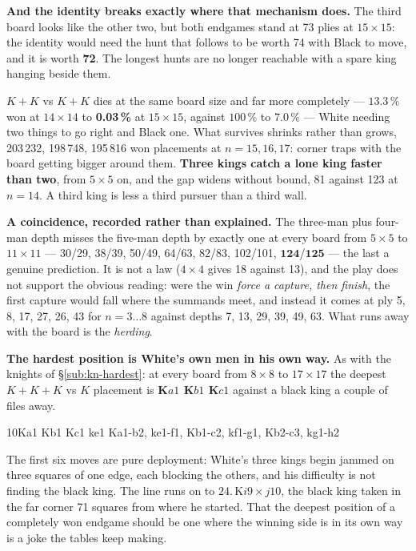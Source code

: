\documentclass[10pt]{article}
\begin{document}
\medskip
\noindent
\textbf{And the identity breaks exactly where that mechanism does.} The third
board looks like the other two, but both endgames stand at 73 plies at
$15\times15$: the identity would need the hunt that follows to be worth 74 with
Black to move, and it is worth \textbf{72}. The longest hunts are no longer
reachable with a spare king hanging beside them.

\smallskip
\noindent
$K\!+\!K$ vs $K\!+\!K$ dies at the same board size and far more completely ---
$13.3\,\%$ won at $14\times14$ to \textbf{0.03\,\%} at $15\times15$, against
$100\,\%$ to $7.0\,\%$ --- White needing two things to go right and Black one.
What survives shrinks rather than grows, 203\,232, 198\,748, 195\,816 won
placements at $n=15,16,17$: corner traps with the board getting bigger around
them. \textbf{Three kings catch a lone king faster than two}, from $5\times5$
on, and the gap widens without bound, 81 against 123 at $n=14$. A third king is
less a third pursuer than a third wall.

\medskip
\noindent
\textbf{A coincidence, recorded rather than explained.} The three-man plus
four-man depth misses the five-man depth by exactly one at every board from
$5\times5$ to $11\times11$ --- 30/29, 38/39, 50/49, 64/63, 82/83, 102/101,
$\mathbf{124}$/$\mathbf{125}$ --- the last a genuine prediction. It is not a
law ($4\times4$ gives 18 against 13), and the play does not support the obvious
reading: were the win \emph{force a capture, then finish}, the first capture
would fall where the summands meet, and instead it comes at ply 5, 8, 17, 27,
26, 43 for $n=3\ldots8$ against depths 7, 13, 29, 39, 49, 63. What runs away
with the board is the \emph{herding}.

\medskip
\noindent
\textbf{The hardest position is White's own men in his own way.} As with the
knights of \S\ref{sub:kn-hardest}: at every board from $8\times8$ to
$17\times17$ the deepest $K\!+\!K\!+\!K$ vs $K$ placement is \textbf{K$a1$
K$b1$ K$c1$} against a black king a couple of files away.

\medskip
\noindent
\begin{minipage}[t]{0.34\textwidth}
\begin{stepboard}[width=\linewidth,board=3.11cm,height=48mm,variant=C,coords=false,
  intro={$10\times10$, White to move, \textbf{47 plies}}]{10}{Ka1 Kb1 Kc1 ke1}
  Ka1-b2, ke1-f1, Kb1-c2, kf1-g1, Kb2-c3, kg1-h2
\end{stepboard}
\end{minipage}\hfill
\begin{minipage}[t]{0.62\textwidth}\vspace{0pt}\small
The first six moves are pure deployment: White's three kings begin jammed on
three squares of one edge, each blocking the others, and his difficulty is not
finding the black king. The line runs on to $24.\,\text{K}i9\times j10$, the
black king taken in the far corner 71 squares from where he started. That the
deepest position of a completely won endgame should be one where the winning
side is in its own way is a joke the tables keep making.
\end{minipage}
\end{document}
